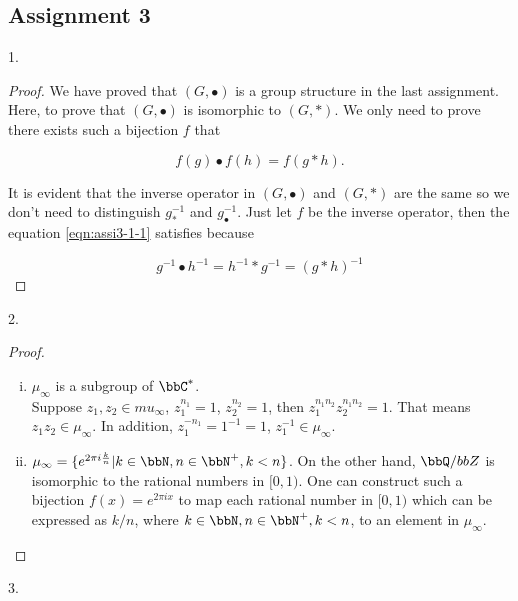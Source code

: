 \subsection{Assignment 3}

\begin{exercise}
    1.
\end{exercise}


\begin{proof}
    We have proved that $(G, \bullet)$ is a group structure in the last assignment. Here, to prove that $(G, \bullet)$ is isomorphic to $(G, *)$. We only need to prove there exists such a bijection $f$ that 

    \begin{equation}\label{eqn:assi3-1-1}
        f(g)\bullet f(h)=f(g*h)\text{.}
    \end{equation}

    It is evident that the inverse operator in $(G, \bullet)$ and $(G, *)$ are the same so we don't need to distinguish $g^{-1}_{*}$ and  $g^{-1}_{\bullet}$. Just let $f$ be the inverse operator, then the equation \ref{eqn:assi3-1-1} satisfies because 

    $$g^{-1} \bullet h^{-1} = h^{-1} * g^{-1} = (g*h)^{-1} $$
\end{proof}

\begin{exercise}
    2.
\end{exercise}

\begin{proof}
    \begin{enumerate}[(i)]
        \item $\mu_\infty$ is a subgroup of $\bbC^{*}$.\\
        Suppose $z_1,z_2\in mu_\infty$, $z_1^{n_1}=1$, $z_2^{n_2}=1$, then $z_1^{n_1n_2}z_2^{n_1n_2}=1$. That means $z_1z_2 \in \mu_\infty$. In addition, $z_1^{-n_1}=1^{-1}=1$, $z_1^{-1} \in \mu_\infty$.
        \item $\mu_\infty=\{e^{2\pi i\frac{k}{n}}| k\in \bbN, n\in \bbN^{+},k<n\}$. On the other hand, $\bbQ/bbZ$ is isomorphic to the rational numbers in $[0,1)$. One can construct such a bijection $f(x)=e^{2\pi ix}$ to map each rational number  in $[0,1)$ which can be expressed as $k/n$, where $k\in \bbN, n\in \bbN^{+},k<n$, to an element in $\mu_\infty$.
    \end{enumerate}
\end{proof}

\begin{exercise}
    3.
\end{exercise}


